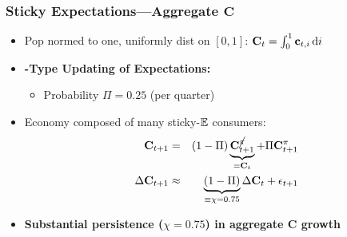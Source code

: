 \documentclass{beamer}\usepackage{dcolumn}
\newcommand{\jbemph}[1]{\textbf{\color{SlideNavy}#1}}
\begin{document}
\begin{frame}
\frametitle{Sticky Expectations---Aggregate $\mathbf{C}$}

\begin{itemize}
\setlength{\itemsep}{2mm}
\item Pop normed to one, uniformly dist on $[0,1]$:
$\mathbf{C}_{t} = \int_{0}^{1} \mathbf{c}_{t,i}\,\text{d}i$

\item \jbemph{\cite{calvoPrices}-Type Updating of Expectations:}
\begin{itemize}
\item Probability $\Pi = 0.25$ (per quarter)
\end{itemize}

\item Economy composed of many sticky-$\mathbb{E}$ consumers:
\begin{eqnarray*}
 \mathbf{C}_{t+1} & = & (1-\Pi) \underbrace{\mathbf{C}^{\cancel{{\pi}}}_{t+1}}_{=\mathbf{C}_{t}} \label{eq:Ctp1} + \Pi \mathbf{C}^{{\pi}}_{t+1}
 \\
  \Delta \mathbf{C}_{t+1} & \approx & \underbrace{(1-\Pi)}_{{}\equiv\chi=0.75} \Delta \mathbf{C}_{t} + \epsilon_{t+1}
\end{eqnarray*}
\item \jbemph{Substantial persistence ($\chi=0.75$) in aggregate C growth}
\end{itemize}
\end{frame}
\end{document}
